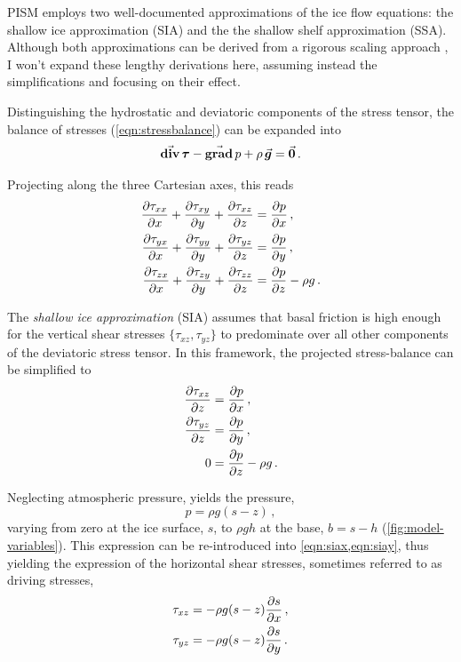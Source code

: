 \documentclass[a4paper]{kappa}
\newcommand{\vect}[1]{\va*{#1}} %
\newcommand{\tens}[1]{\vb*{#1}} %
\renewcommand{\grad}[1]{\vect{\mathrm{grad}}\,#1}   %
\newcommand{\tdiv}[1]{\vect{\mathrm{div}}\,#1}      %
\newcommand{\DST}[0]{\tens{\tau}}       %
\begin{document}
PISM employs two well-documented
approximations of the ice flow equations: the shallow ice approximation (SIA)
and the the shallow shelf approximation (SSA). Although both approximations can
be derived from a rigorous scaling approach
    \citep{Morland.Johnson.1980, Hutter.1983,
           Morland.1987, Weis.etal.1999},
I won't expand these lengthy derivations
here, assuming instead the simplifications and focusing on their effect.

Distinguishing the hydrostatic and deviatoric components of the stress tensor,
the balance of stresses (\ref{eqn:stressbalance}) can be expanded into
\begin{equation}
    \tdiv{\DST} - \grad{p} + \rho\,\vect{g} = \vect{0} \,.
\end{equation}

Projecting along the three Cartesian axes, this reads
\begin{subequations}
\label{eqn:fullstokes}
\begin{align}
    \pdv{\tau_{xx}}{x} + \pdv{\tau_{xy}}{y} + \pdv{\tau_{xz}}{z}
        &= \pdv{p}{x} \,, \\
    \pdv{\tau_{yx}}{x} + \pdv{\tau_{yy}}{y} + \pdv{\tau_{yz}}{z}
        &= \pdv{p}{y} \,, \\
    \pdv{\tau_{zx}}{x} + \pdv{\tau_{zy}}{y} + \pdv{\tau_{zz}}{z}
        &= \pdv{p}{z} - \rho g \,.
\end{align}
\end{subequations}

The \emph{shallow ice approximation} (SIA) assumes that basal friction is high
enough
for the vertical shear stresses $\{\tau_{xz}, \tau_{yz}\}$ to predominate over
all other components of the deviatoric stress tensor. In this framework, the
projected stress-balance can be simplified to
\begin{subequations}
\label{eqn:sia}
\begin{align}
    \label{eqn:siax}
    \pdv{\tau_{xz}}{z} &= \pdv{p}{x} \,, \\
    \label{eqn:siay}
    \pdv{\tau_{yz}}{z} &= \pdv{p}{y} \,, \\
    \label{eqn:siaz}
    0 &= \pdv{p}{z} - \rho g \,.
\end{align}
\end{subequations}

Neglecting atmospheric pressure,  yields the pressure,
\begin{equation}
    p = \rho g (s-z) \,,
\end{equation}
varying from zero at the ice surface, $s$, to $\rho gh$ at the base, ${b=s-h}$
(\cref{fig:model-variables}). This expression
can be re-introduced into \cref{eqn:siax,eqn:siay}, thus yielding the
expression of the horizontal shear stresses, sometimes referred to as driving
stresses,
\begin{subequations}
\begin{align}
    \tau_{xz} &= -\rho g (s-z) \pdv{s}{x} \,, \\
    \tau_{yz} &= -\rho g (s-z) \pdv{s}{y} \,.
\end{align}
\end{subequations}
\end{document}
